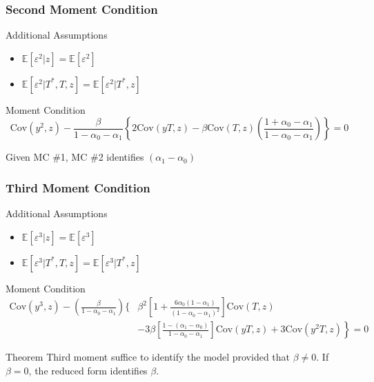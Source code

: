 \documentclass{beamer}
\begin{document}
\begin{frame}
  \frametitle{Second Moment Condition}
  \begin{block}{Additional Assumptions}
    \begin{itemize}
      \item $\mathbb{E}[\varepsilon^2|z]=\mathbb{E}[\varepsilon^2]$
      \item $\mathbb{E}[\varepsilon^2|T^*,T,z] =  \mathbb{E}[\varepsilon^2|T^*,z]$
    \end{itemize}
  \end{block}

  \begin{block}{Moment Condition}
    \small
  \[\mbox{Cov}(y^2,z) - \frac{\beta}{1 - \alpha_0 - \alpha_1}\left\{2\mbox{Cov}(yT,z)- \beta \mbox{Cov}(T,z)\left( \frac{1 + \alpha_0 - \alpha_1}{1 - \alpha_0 - \alpha_1} \right)  \right\} = 0\]
  \end{block}

  \alert{Given MC \#1, MC \#2 identifies $(\alpha_1 - \alpha_0)$}
\end{frame}
\begin{frame}
  \frametitle{Third Moment Condition}
  \begin{block}{Additional Assumptions}
    \begin{itemize}
      \item $\mathbb{E}[\varepsilon^3|z]=\mathbb{E}[\varepsilon^3]$
      \item $\mathbb{E}[\varepsilon^3|T^*,T,z] =  \mathbb{E}[\varepsilon^3|T^*,z]$
    \end{itemize}
  \end{block}
  \begin{block}{Moment Condition}
\scriptsize
\begin{align*}
  \mbox{Cov}(y^3,z) - \left( \frac{\beta}{1 - \alpha_0 - \alpha_1} \right)\Bigg \{& \left. \beta^2\left[1 + \frac{6\alpha_0(1 - \alpha_1)}{(1 - \alpha_0 - \alpha_1)^2} \right] \mbox{Cov}(T,z)\right.\\ & \left. - 3\beta\left[ \frac{1 - (\alpha_1 - \alpha_0)}{1 - \alpha_0 - \alpha_1} \right] \mbox{Cov}(yT,z) + 3\mbox{Cov}(y^2T,z) \right\} = 0
\end{align*}
\end{block}
\normalsize
\begin{alertblock}{Theorem}
  Third moment suffice to identify the model provided that $\beta \neq 0$. If $\beta = 0$, the reduced form identifies $\beta$.
\end{alertblock}
\end{frame}
\end{document}
